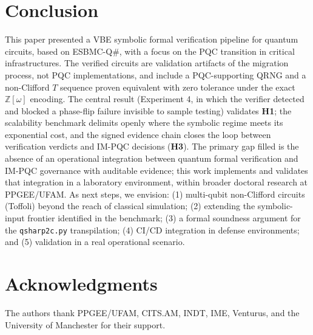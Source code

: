 \documentclass[journal]{IEEEtran} %
\begin{document}
\section{Conclusion}
This paper presented a VBE symbolic formal verification pipeline for quantum circuits, based on ESBMC-Q\#, with a focus on the PQC transition in critical infrastructures. The verified circuits are validation artifacts of the migration process, not PQC implementations, and include a PQC-supporting QRNG and a non-Clifford $T$ sequence proven equivalent with zero tolerance under the exact $\mathbb{Z}[\omega]$ encoding. The central result (Experiment 4, in which the verifier detected and blocked a phase-flip failure invisible to sample testing) validates \textbf{H1}; the scalability benchmark delimits openly where the symbolic regime meets its exponential cost, and the signed evidence chain closes the loop between verification verdicts and IM-PQC decisions (\textbf{H3}). The primary gap filled is the absence of an operational integration between quantum formal verification and IM-PQC governance with auditable evidence; this work implements and validates that integration in a laboratory environment, within broader doctoral research at PPGEE/UFAM. As next steps, we envision: (1) multi-qubit non-Clifford circuits (Toffoli) beyond the reach of classical simulation; (2) extending the symbolic-input frontier identified in the benchmark; (3) a formal soundness argument for the \texttt{qsharp2c.py} transpilation; (4) CI/CD integration in defense environments; and (5) validation in a real operational scenario.

\section*{Acknowledgments}
The authors thank PPGEE/UFAM, CITS.AM, INDT, IME, Venturus, and the University of Manchester for their support.
\end{document}
